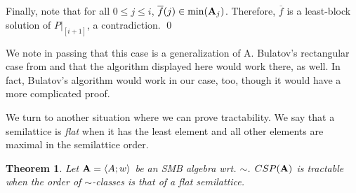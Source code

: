 \documentclass[11pt]{amsart}
\newcommand{\m}[1]{{\uppercase {\mathbf {#1}}}}
\newcommand{\lb}{\langle}
\newcommand{\rb}{\rangle}
\newtheorem{thm}{Theorem}[section]
\theoremstyle{definition}
\begin{document}
Finally, note that for all $0\leq j\leq i$, $\overline{f}(j)\in\mathrm{min}(\m A_j)$. Therefore, $\overline{f}$ is a least-block solution of $P|_{[i+1]}$, a contradiction.
\qed

We note in passing that this case is a generalization of A. Bulatov's rectangular case from \cite{3el} and that the algorithm displayed here would work there, as well. In fact, Bulatov's algorithm would work in our case, too, though it would have a more complicated proof.

We turn to another situation where we can prove tractability. We say that a semilattice is {\em flat} when it has the least element and all other elements are maximal in the semilattice order.

\begin{thm}\label{flattract}
Let $\m a=\lb A;w\rb$ be an SMB algebra wrt. $\sim$. $CSP(\m a)$ is tractable when the order of $\sim$-classes is that of a flat semilattice.
\end{thm}
\end{document}
